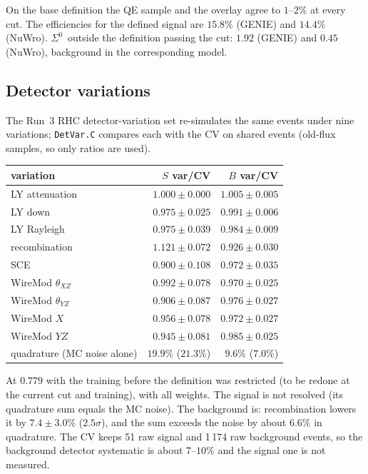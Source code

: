 \documentclass[11pt,a4paper]{article}
\newcommand{\Szero}{\ensuremath{\Sigma^{0}}}
\begin{document}
\noindent On the base definition the QE sample and the overlay agree to $1$--$2\%$ at every
cut. The efficiencies for the defined signal are $15.8\%$ (GENIE) and $14.4\%$ (NuWro). \Szero\
outside the definition passing the cut: $1.92$ (GENIE) and $0.45$ (NuWro), background in the
corresponding model.

\subsection{Detector variations}
\label{sec:detvar}
The Run~3 RHC detector-variation set re-simulates the same events under nine variations;
\texttt{DetVar.C} compares each with the CV on shared events (old-flux samples, so only
ratios are used).

\begin{center}
\begin{tabular}{lrr}
\toprule
variation & $S$ var/CV & $B$ var/CV \\
\midrule
LY attenuation         & $1.000\pm0.000$ & $1.005\pm0.005$ \\
LY down                & $0.975\pm0.025$ & $0.991\pm0.006$ \\
LY Rayleigh            & $0.975\pm0.039$ & $0.984\pm0.009$ \\
recombination          & $1.121\pm0.072$ & $0.926\pm0.030$ \\
SCE                    & $0.900\pm0.108$ & $0.972\pm0.035$ \\
WireMod $\theta_{XZ}$  & $0.992\pm0.078$ & $0.970\pm0.025$ \\
WireMod $\theta_{YZ}$  & $0.906\pm0.087$ & $0.976\pm0.027$ \\
WireMod $X$            & $0.956\pm0.078$ & $0.972\pm0.027$ \\
WireMod $YZ$           & $0.945\pm0.081$ & $0.985\pm0.025$ \\
\midrule
quadrature (MC noise alone) & $19.9\%$ ($21.3\%$) & $9.6\%$ ($7.0\%$) \\
\bottomrule
\end{tabular}
\end{center}

\noindent At $0.779$ with the training before the definition was restricted (to be redone
at the current cut and training), with all weights. The signal is not resolved (its quadrature sum
equals the MC noise). The background is: recombination lowers it by $7.4\pm3.0\%$
($2.5\sigma$), and the sum exceeds the noise by about $6.6\%$ in quadrature. The CV keeps
51 raw signal and 1\,174 raw background events, so the background detector systematic is
about $7$--$10\%$ and the signal one is not measured.
\end{document}

